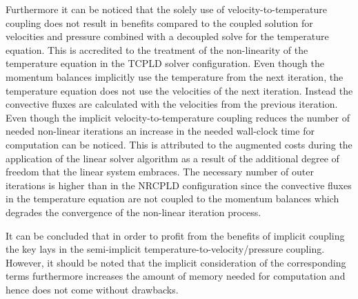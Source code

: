 Furthermore it can be noticed that the solely use of velocity-to-temperature coupling does not result in benefits compared to the coupled solution for velocities and pressure combined with a decoupled solve for the temperature equation. This is accredited to the treatment of the non-linearity of the temperature equation in the TCPLD solver configuration. Even though the momentum balances implicitly use the temperature from the next iteration, the temperature equation does not use the velocities of the next iteration. Instead the convective fluxes are calculated with the velocities from the previous iteration. Even though the implicit velocity-to-temperature coupling reduces the number of needed non-linear iterations an increase in the needed wall-clock time for computation can be noticed. This is attributed to the augmented costs during the application of the linear solver algorithm as a result of the additional degree of freedom that the linear system embraces. The necessary number of outer iterations is higher than in the NRCPLD configuration since the convective fluxes in the temperature equation are not coupled to the momentum balances which degrades the convergence of the non-linear iteration process.

It can be concluded that in order to profit from the benefits of implicit coupling the key lays in the semi-implicit temperature-to-velocity/pressure coupling. However, it should be noted that the implicit consideration of the corresponding terms furthermore increases the amount of memory needed for computation and hence does not come without drawbacks.

